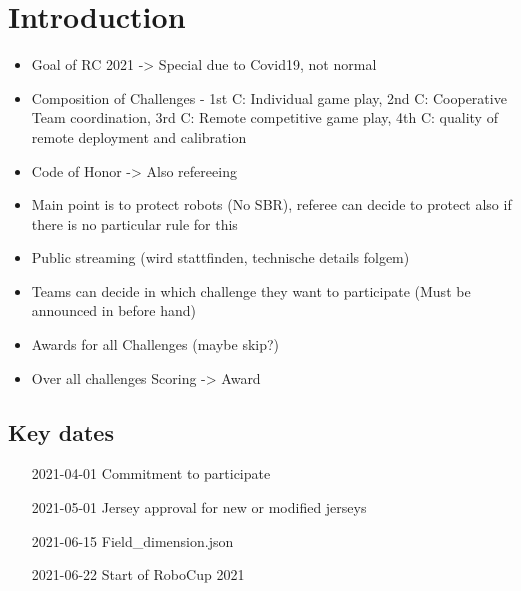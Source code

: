 \section{Introduction}

\begin{itemize}
    \item Goal of RC 2021 -> Special due to Covid19, not normal
    \item Composition of Challenges - 1st C: Individual game play, 2nd C: Cooperative Team coordination, 3rd C: Remote competitive game play, 4th C: quality of remote deployment and calibration 
    \item Code of Honor -> Also refereeing
    \item Main point is to protect robots (No SBR), referee can decide to protect also if there is no particular rule for this
    \item Public streaming (wird stattfinden, technische details folgem)
    \item Teams can decide in which challenge they want to participate (Must be announced in before hand)
    \item Awards for all Challenges (maybe skip?)
    \item Over all challenges Scoring -> Award
\end{itemize}

\subsection{Key dates}

\begin{itemize}
    \item [2021-04-01] Commitment to participate
    \item [2021-05-01] Jersey approval for new or modified jerseys
    \item [2021-06-15] Field\_dimension.json
    \item [2021-06-22] Start of RoboCup 2021
\end{itemize}
